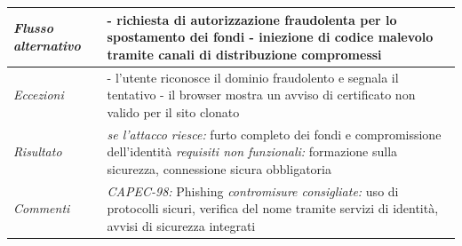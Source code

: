 \begin{longtable}{| >{\columncolor{abuseCol}}p{} | p{} |}
\hline
\textit{Flusso alternativo} & - richiesta di autorizzazione fraudolenta per lo spostamento dei fondi \newline - iniezione di codice malevolo tramite canali di distribuzione compromessi \\
\hline
\textit{Eccezioni} & - l'utente riconosce il dominio fraudolento e segnala il tentativo \newline - il browser mostra un avviso di certificato non valido per il sito clonato \\
\hline
\textit{Risultato} & \textit{se l'attacco riesce:} furto completo dei fondi e compromissione dell'identità \newline \textit{requisiti non funzionali:} formazione sulla sicurezza, connessione sicura obbligatoria \\
\hline
\textit{Commenti} & \textit{CAPEC-98:} Phishing \newline \textit{contromisure consigliate:} uso di protocolli sicuri, verifica del nome tramite servizi di identità, avvisi di sicurezza integrati \\
\hline
\end{longtable}

